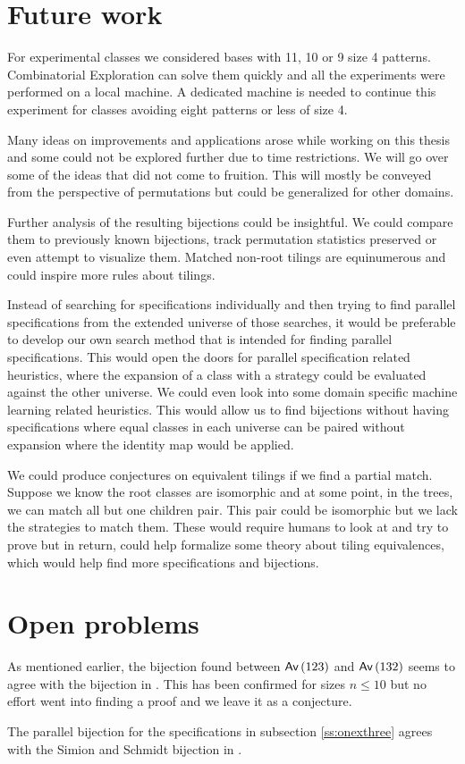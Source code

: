 \label{ch:conclusion}

\section{Future work}\label{s:fw}
For experimental classes we considered bases with 11, 10 or 9 size 4 patterns. Combinatorial Exploration can solve them quickly and all the experiments were performed on a local machine. A dedicated machine is needed to continue this experiment for classes avoiding eight patterns or less of size 4.

Many ideas on improvements and applications arose while working on this thesis and some could not be explored further due to time restrictions. We will go over some of the ideas that did not come to fruition. This will mostly be conveyed from the perspective of permutations but could be generalized for other domains.

Further analysis of the resulting bijections could be insightful. We could compare them to previously known bijections, track permutation statistics preserved or even attempt to visualize them. Matched non-root tilings are equinumerous and could inspire more rules about tilings.

Instead of searching for specifications individually and then trying to find parallel specifications from the extended universe of those searches, it would be preferable to develop our own search method that is intended for finding parallel specifications. This would open the doors for parallel specification related heuristics, where the expansion of a class with a strategy could be evaluated against the other universe. We could even look into some domain specific machine learning related heuristics. This would allow us to find bijections without having specifications where equal classes in each universe can be paired without expansion where the identity map would be applied.

We could produce conjectures on equivalent tilings if we find a partial match. Suppose we know the root classes are isomorphic and at some point, in the trees, we can match all but one children pair. This pair could be isomorphic but we lack the strategies to match them. These would require humans to look at and try to prove but in return, could help formalize some theory about tiling equivalences, which would help find more specifications and bijections.

\section{Open problems}
As mentioned earlier, the bijection found between $\textsf{Av}\left(123\right)$ and $\textsf{Av}\left(132\right)$ seems to agree with the \citeauthor{simionandschmidt} bijection in \cite{simionandschmidt}. This has been confirmed for sizes $n \leq 10$ but no effort went into finding a proof and we leave it as a conjecture.
\begin{conjecture}\label{con:ss}
The parallel bijection for the specifications in subsection \ref{ss:onexthree} agrees with the Simion and Schmidt bijection in \cite{simionandschmidt}.
\end{conjecture}

